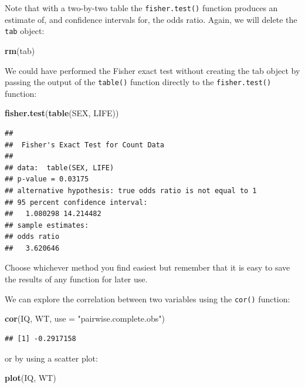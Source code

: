 \documentclass[12pt,]{book}
\newenvironment{Shaded}{\begin{snugshade}}{\end{snugshade}}
\newcommand{\KeywordTok}[1]{\textcolor[rgb]{0.13,0.29,0.53}{\textbf{#1}}}
\newcommand{\DataTypeTok}[1]{\textcolor[rgb]{0.13,0.29,0.53}{#1}}
\newcommand{\StringTok}[1]{\textcolor[rgb]{0.31,0.60,0.02}{#1}}
\newcommand{\NormalTok}[1]{#1}
\theoremstyle{definition}
\theoremstyle{definition}
\theoremstyle{definition}
\theoremstyle{remark}
\begin{document}
Note that with a two-by-two table the \texttt{fisher.test()} function
produces an estimate of, and confidence intervals for, the odds ratio.
Again, we will delete the \texttt{tab} object:

\begin{Shaded}
\begin{Highlighting}[]
\KeywordTok{rm}\NormalTok{(tab)}
\end{Highlighting}
\end{Shaded}

We could have performed the Fisher exact test without creating the tab
object by passing the output of the \texttt{table()} function directly
to the \texttt{fisher.test()} function:

\begin{Shaded}
\begin{Highlighting}[]
\KeywordTok{fisher.test}\NormalTok{(}\KeywordTok{table}\NormalTok{(SEX, LIFE))}
\end{Highlighting}
\end{Shaded}

\begin{verbatim}
## 
##  Fisher's Exact Test for Count Data
## 
## data:  table(SEX, LIFE)
## p-value = 0.03175
## alternative hypothesis: true odds ratio is not equal to 1
## 95 percent confidence interval:
##   1.080298 14.214482
## sample estimates:
## odds ratio 
##   3.620646
\end{verbatim}

Choose whichever method you find easiest but remember that it is easy to
save the results of any function for later use.

We can explore the correlation between two variables using the
\texttt{cor()} function:

\begin{Shaded}
\begin{Highlighting}[]
\KeywordTok{cor}\NormalTok{(IQ, WT, }\DataTypeTok{use =} \StringTok{"pairwise.complete.obs"}\NormalTok{)}
\end{Highlighting}
\end{Shaded}

\begin{verbatim}
## [1] -0.2917158
\end{verbatim}

or by using a scatter plot:

\begin{Shaded}
\begin{Highlighting}[]
\KeywordTok{plot}\NormalTok{(IQ, WT)}
\end{Highlighting}
\end{Shaded}
\end{document}
